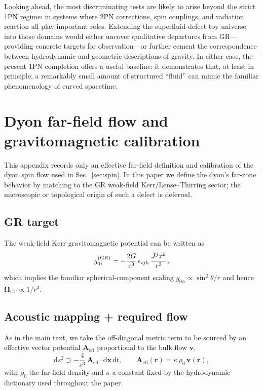\documentclass[11pt]{article}
\newcommand{\dd}{\mathrm{d}}
\begin{document}
Looking ahead, the most discriminating tests are likely to arise
beyond the strict 1PN regime: in systems where 2PN corrections, spin
couplings, and radiation reaction all play important roles.
Extending the superfluid-defect toy universe into those domains would
either uncover qualitative departures from GR---providing concrete
targets for observation---or further cement the correspondence
between hydrodynamic and geometric descriptions of gravity.
In either case, the present 1PN completion offers a useful baseline:
it demonstrates that, at least in principle, a remarkably small
amount of structured ``fluid'' can mimic the familiar phenomenology
of curved spacetime.

\appendix

\section{Dyon far-field flow and gravitomagnetic calibration}
\label{app:dyon-flow}

This appendix records only an effective far-field definition and calibration of
the dyon spin flow used in Sec.~\ref{sec:spin}.
In this paper we define the dyon's far-zone behavior by matching to the GR
weak-field Kerr/Lense--Thirring sector; the microscopic or topological origin
of such a defect is deferred.

\subsection{GR target}

The weak-field Kerr gravitomagnetic potential can be written as
\begin{equation}
  g_{0i}^{\rm (GR)}
  = -\frac{2G}{c^3}\,
    \epsilon_{ijk}\,\frac{J^j x^k}{r^3},
  \label{eq:app-g0i-GR}
\end{equation}
which implies the familiar spherical-component scaling
$g_{0\phi}\propto \sin^2\theta/r$ and hence
$\bm{\Omega}_{\text{LT}}\propto 1/r^3$.

\subsection{Acoustic mapping + required flow}

As in the main text, we take the off-diagonal metric term to be sourced by an
effective vector potential $\mathbf{A}_{\text{eff}}$ proportional to the bulk
flow $\mathbf{v}$,
\begin{equation}
  \dd s^2
  \supset - \frac{4}{c^3}\,\mathbf{A}_{\text{eff}}\cdot\dd\mathbf{x}\,\dd t,
  \qquad
  \mathbf{A}_{\text{eff}}(\mathbf{r})=\kappa\,\rho_0\,\mathbf{v}(\mathbf{r}),
\end{equation}
with $\rho_0$ the far-field density and $\kappa$ a constant fixed by the
hydrodynamic dictionary used throughout the paper.
\end{document}
